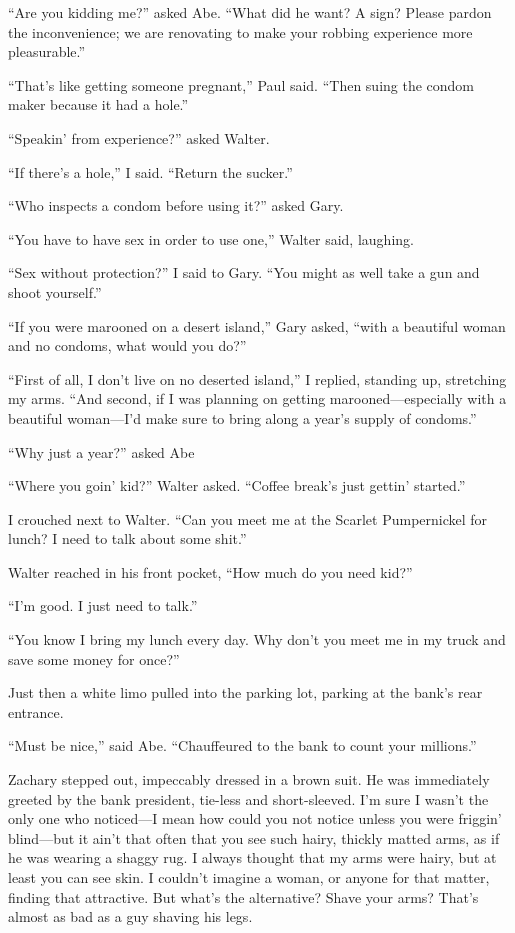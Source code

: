 ``Are you kidding me?'' asked Abe. ``What did he want? A sign? Please
pardon the inconvenience; we are renovating to make your robbing
experience more pleasurable.''

``That's like getting someone pregnant,'' Paul said. ``Then suing the
condom maker because it had a hole.''

``Speakin' from experience?'' asked Walter.

``If there's a hole,'' I said. ``Return the sucker.''

``Who inspects a condom before using it?'' asked Gary.

``You have to have sex in order to use one,'' Walter said, laughing.

``Sex without protection?'' I said to Gary. ``You might as well take a
gun and shoot yourself.''

``If you were marooned on a desert island,'' Gary asked, ``with a
beautiful woman and no condoms, what would you do?''

``First of all, I don't live on no deserted island,'' I replied,
standing up, stretching my arms. ``And second, if I was planning on
getting marooned---especially with a beautiful woman---I'd make sure to
bring along a year's supply of condoms.''

``Why just a year?'' asked Abe

``Where you goin' kid?'' Walter asked. ``Coffee break's just gettin'
started.''

I crouched next to Walter. ``Can you meet me at the Scarlet Pumpernickel
for lunch? I need to talk about some shit.''

Walter reached in his front pocket, ``How much do you need kid?''

``I'm good. I just need to talk.''

``You know I bring my lunch every day. Why don't you meet me in my truck
and save some money for once?''

Just then a white limo pulled into the parking lot, parking at the
bank's rear entrance.

``Must be nice,'' said Abe. ``Chauffeured to the bank to count your
millions.''

Zachary stepped out, impeccably dressed in a brown suit. He was
immediately greeted by the bank president, tie-less and short-sleeved.
I'm sure I wasn't the only one who noticed---I mean how could you not
notice unless you were friggin' blind---but it ain't that often that you
see such hairy, thickly matted arms, as if he was wearing a shaggy rug.
I always thought that my arms were hairy, but at least you can see skin.
I couldn't imagine a woman, or anyone for that matter, finding that
attractive. But what's the alternative? Shave your arms? That's almost
as bad as a guy shaving his legs.

